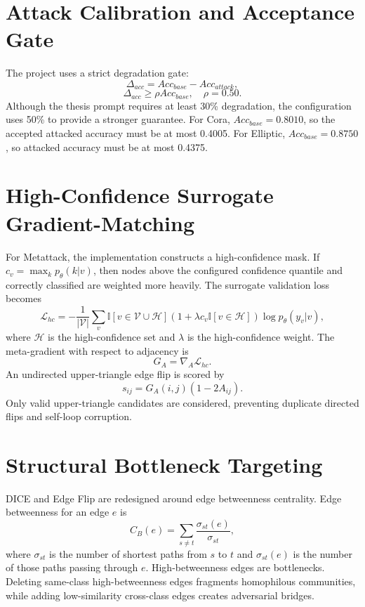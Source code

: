 \documentclass[12pt,oneside]{report}
\begin{document}
\section{Attack Calibration and Acceptance Gate}
The project uses a strict degradation gate:
\begin{equation}
\Delta_{acc}=Acc_{base}-Acc_{attack},
\end{equation}
\begin{equation}
\Delta_{acc}\geq \rho Acc_{base}, \quad \rho=0.50.
\end{equation}
Although the thesis prompt requires at least 30\% degradation, the configuration uses 50\% to provide a stronger guarantee. For Cora, \(Acc_{base}=0.8010\), so the accepted attacked accuracy must be at most 0.4005. For Elliptic, \(Acc_{base}=0.8750\), so attacked accuracy must be at most 0.4375.

\section{High-Confidence Surrogate Gradient-Matching}
For Metattack, the implementation constructs a high-confidence mask. If \(c_v=\max_k p_\theta(k|v)\), then nodes above the configured confidence quantile and correctly classified are weighted more heavily. The surrogate validation loss becomes
\begin{equation}
\mathcal{L}_{hc}=-\frac{1}{|\mathcal{V}|}\sum_v \mathbb{I}[v\in \mathcal{V}\cup \mathcal{H}]
\left(1+\lambda c_v\mathbb{I}[v\in\mathcal{H}]\right)\log p_\theta(y_v|v),
\end{equation}
where \(\mathcal{H}\) is the high-confidence set and \(\lambda\) is the high-confidence weight. The meta-gradient with respect to adjacency is
\begin{equation}
G_A=\nabla_A \mathcal{L}_{hc}.
\end{equation}
An undirected upper-triangle edge flip is scored by
\begin{equation}
s_{ij}=G_A(i,j)(1-2A_{ij}).
\end{equation}
Only valid upper-triangle candidates are considered, preventing duplicate directed flips and self-loop corruption.

\section{Structural Bottleneck Targeting}
DICE and Edge Flip are redesigned around edge betweenness centrality. Edge betweenness for an edge \(e\) is
\begin{equation}
C_B(e)=\sum_{s\neq t}\frac{\sigma_{st}(e)}{\sigma_{st}},
\end{equation}
where \(\sigma_{st}\) is the number of shortest paths from \(s\) to \(t\) and \(\sigma_{st}(e)\) is the number of those paths passing through \(e\). High-betweenness edges are bottlenecks. Deleting same-class high-betweenness edges fragments homophilous communities, while adding low-similarity cross-class edges creates adversarial bridges.
\end{document}
